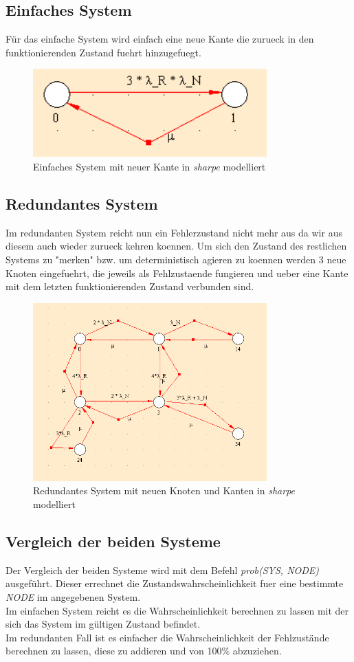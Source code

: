 \documentclass[10pt,a4paper]{article}
\begin{document}
\subsection{Einfaches System}
Für das einfache System wird einfach eine neue Kante die zurueck in den funktionierenden Zustand fuehrt hinzugefuegt.
\begin{figure}[ht!]
\centering
\includegraphics[width=90mm]{AVAILABILITY_Einfach.png}
\caption{Einfaches System mit neuer Kante in \textit{sharpe} modelliert \label{avail_einfach}}
\end{figure}

\subsection{Redundantes System}
Im redundanten System reicht nun ein Fehlerzustand nicht mehr aus da wir aus diesem auch wieder zurueck kehren koennen. Um sich den Zustand des restlichen Systems zu "merken" bzw. um deterministisch agieren zu koennen werden 3 neue Knoten eingefuehrt, die jeweils als Fehlzustaende fungieren und ueber eine Kante mit dem letzten funktionierenden Zustand verbunden sind. 
\begin{figure}[ht!]
\centering
\includegraphics[width=90mm]{AVAILABILITY_RED.png}
\caption{Redundantes System mit neuen Knoten und Kanten in \textit{sharpe} modelliert \label{avail_einfach}}
\end{figure}

\newpage
\subsection{Vergleich der beiden Systeme}
Der Vergleich der beiden Systeme wird mit dem Befehl \textit{prob(SYS, NODE)} ausgeführt. Dieser errechnet die Zustandswahrscheinlichkeit fuer eine bestimmte \textit{NODE} im angegebenen System.\\
Im einfachen System reicht es die Wahrscheinlichkeit berechnen zu lassen mit der sich das System im gültigen Zustand befindet. \\
Im redundanten Fall ist es einfacher die Wahrscheinlichkeit der Fehlzustände berechnen zu lassen, diese zu addieren und von 100\% abzuziehen.
\end{document}

